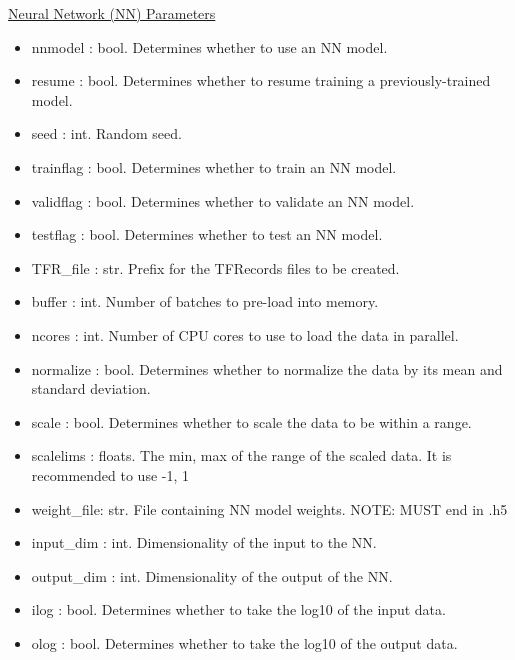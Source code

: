 \documentclass[letterpaper, 12pt]{article}
\begin{document}
\noindent \underline{Neural Network (NN) Parameters}
\begin{itemize}
\item nnmodel    : bool. Determines whether to use an NN model.
\item resume     : bool. Determines whether to resume training a previously-trained 
                   model.
\item seed       : int.  Random seed.
\item trainflag  : bool. Determines whether to train    an NN model.
\item validflag  : bool. Determines whether to validate an NN model.
\item testflag   : bool. Determines whether to test     an NN model.

\item TFR\_file  : str.  Prefix for the TFRecords files to be created.
\item buffer     : int.  Number of batches to pre-load into memory.
\item ncores     : int.  Number of CPU cores to use to load the data in parallel.

\item normalize  : bool. Determines whether to normalize the data by its mean and 
                   standard deviation.
\item scale      : bool. Determines whether to scale the data to be within a range.
\item scalelims  : floats. The min, max of the range of the scaled data.
                     It is recommended to use -1, 1

\item weight\_file: str.  File containing NN model weights.
                          NOTE: MUST end in .h5
\item input\_dim  : int.  Dimensionality of the input  to the NN.
\item output\_dim : int.  Dimensionality of the output of the NN.
\item ilog        : bool. Determines whether to take the log10 of the input  data.
\item olog        : bool. Determines whether to take the log10 of the output data.


\end{itemize}
\end{document}
